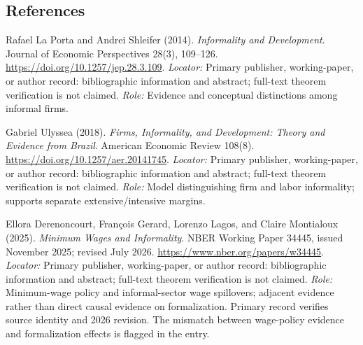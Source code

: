 \documentclass[11pt,a4paper]{article}
\begin{document}
\subsection*{References}
\begin{enumerate}[label=\textnormal{[S\arabic*]},leftmargin=*]
\item Rafael La Porta and Andrei Shleifer (2014). \emph{Informality and Development}. Journal of Economic Perspectives 28(3), 109--126. \url{https://doi.org/10.1257/jep.28.3.109}. \textit{Locator:} Primary publisher, working-paper, or author record: bibliographic information and abstract; full-text theorem verification is not claimed. \textit{Role:} Evidence and conceptual distinctions among informal firms.
\item Gabriel Ulyssea (2018). \emph{Firms, Informality, and Development: Theory and Evidence from Brazil}. American Economic Review 108(8). \url{https://doi.org/10.1257/aer.20141745}. \textit{Locator:} Primary publisher, working-paper, or author record: bibliographic information and abstract; full-text theorem verification is not claimed. \textit{Role:} Model distinguishing firm and labor informality; supports separate extensive/intensive margins.
\item Ellora Derenoncourt, François Gerard, Lorenzo Lagos, and Claire Montialoux (2025). \emph{Minimum Wages and Informality}. NBER Working Paper 34445, issued November 2025; revised July 2026. \url{https://www.nber.org/papers/w34445}. \textit{Locator:} Primary publisher, working-paper, or author record: bibliographic information and abstract; full-text theorem verification is not claimed. \textit{Role:} Minimum-wage policy and informal-sector wage spillovers; adjacent evidence rather than direct causal evidence on formalization. Primary record verifies source identity and 2026 revision. The mismatch between wage-policy evidence and formalization effects is flagged in the entry.
\end{enumerate}
\end{document}
